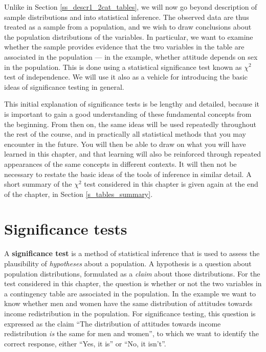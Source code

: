 Unlike in Section \ref{ss_descr1_2cat_tables}, we will now go beyond
description of sample distributions and into
statistical inference. The observed data are thus treated as a sample
from a population, and we wish to draw conclusions about the population
distributions of the variables. In particular, we want to examine
whether the sample provides evidence that the two variables in the table
are associated in the population --- in the example, whether attitude
depends on sex in the population. This is done using a statistical
significance test known as $\chi^{2}$ test of independence.
We will  use it also as a vehicle for introducing
the basic ideas of significance testing in general.

This initial explanation of significance tests is be lengthy and
detailed, because it is important to gain a good understanding of these
fundamental concepts from the beginning. From then on, the same ideas
will be used repeatedly throughout the rest of the course, and in
practically all statistical methods that you may encounter in the
future. You will then be able to draw on what you will have learned in
this chapter, and that learning will also be reinforced through repeated
appearances of the same concepts in different contexts. It will then not
be necessary to restate the basic ideas of the tools of inference in
similar detail. A short summary of the $\chi^{2}$ test considered in
this chapter is given again at the end of the chapter, in Section
\ref{s_tables_summary}.

\section{Significance tests}
\label{s_tables_tests}

A \textbf{significance test} is a method of statistical inference that
is used to assess the plausibility of \emph{hypotheses} about a
population. A hypothesis is a question about
population distributions, formulated as a \emph{claim}
about those distributions. For the test considered in this chapter, the
question is whether or not the two variables in a contingency
table are associated in the population. In the example we want to know
whether men and women have the same
distribution of attitudes towards income redistribution in the
population. For significance testing, this question is expressed as the claim ``The
distribution of attitudes towards income redistribution \emph{is} the
same for men and women'', to which we want to identify the correct
response, either ``Yes, it is'' or ``No, it isn't''.

